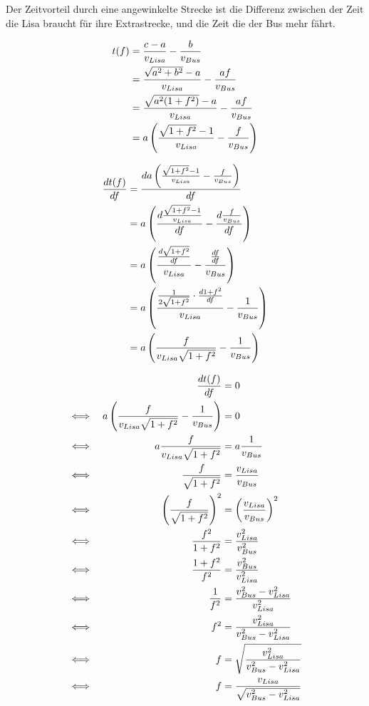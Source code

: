 \documentclass[12pt]{article}
\begin{document}
\begin{minipage}{0.45\textwidth}
Der Zeitvorteil durch eine angewinkelte Strecke ist die Differenz zwischen der Zeit die Lisa braucht für ihre Extrastrecke, und die Zeit die der Bus mehr fährt.

\begin{align*}
t(f) &= \frac{c-a}{v_{Lisa}} - \frac{b}{v_{Bus}}\\
&= \frac{\sqrt{a^2+b^2}-a}{v_{Lisa}} - \frac{af}{v_{Bus}}\\
&= \frac{\sqrt{a^2(1+f^2)}-a}{v_{Lisa}} - \frac{af}{v_{Bus}}\\
&= a\left(\frac{\sqrt{1+f^2}-1}{v_{Lisa}} - \frac{f}{v_{Bus}}\right)\\
\end{align*}
\end{minipage}
\begin{minipage}{0.55\textwidth}
\begin{align*}
\frac{dt(f)}{df} &= \frac{da\left(\frac{\sqrt{1+f^2}-1}{v_{Lisa}} - \frac{f}{v_{Bus}}\right)}{df}\\
&= a\left(\frac{d\frac{\sqrt{1+f^2}-1}{v_{Lisa}}}{df} - \frac{d\frac{f}{v_{Bus}}}{df}\right)\\
&= a\left(\frac{\frac{d\sqrt{1+f^2}}{df}}{v_{Lisa}} - \frac{\frac{df}{df}}{v_{Bus}}\right)\\
&= a\left(\frac{\frac{1}{2\sqrt{1+f^2}}\cdot\frac{d1+f^2}{df}}{v_{Lisa}} - \frac{1}{v_{Bus}}\right)\\
&= a\left(\frac{f}{v_{Lisa}\sqrt{1+f^2}} - \frac{1}{v_{Bus}}\right)\\
\end{align*}
\end{minipage}

\begin{align*}
&&\frac{dt(f)}{df} &= 0\\
\iff&&a\left(\frac{f}{v_{Lisa}\sqrt{1+f^2}} - \frac{1}{v_{Bus}}\right) &= 0\\
\iff&&a\frac{f}{v_{Lisa}\sqrt{1+f^2}} &= a\frac{1}{v_{Bus}}\\
\iff&&\frac{f}{\sqrt{1+f^2}} &= \frac{v_{Lisa}}{v_{Bus}}\\
\iff&&\left(\frac{f}{\sqrt{1+f^2}}\right)^2 &= \left(\frac{v_{Lisa}}{v_{Bus}}\right)^2\\
\iff&&\frac{f^2}{1+f^2} &= \frac{v_{Lisa}^2}{v_{Bus}^2}\\
\iff&&\frac{1+f^2}{f^2} &= \frac{v_{Bus}^2}{v_{Lisa}^2}\\
\iff&&\frac{1}{f^2} &= \frac{v_{Bus}^2-v_{Lisa}^2}{v_{Lisa}^2}\\
\iff&&f^2 &= \frac{v_{Lisa}^2}{v_{Bus}^2-v_{Lisa}^2}\\
\iff&&f &= \sqrt{\frac{v_{Lisa}^2}{v_{Bus}^2-v_{Lisa}^2}}\\
\iff&&f &= \frac{v_{Lisa}}{\sqrt{v_{Bus}^2-v_{Lisa}^2}}\\
\end{align*}
\end{document}
